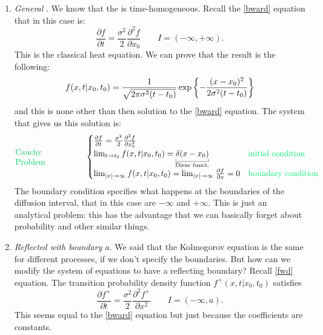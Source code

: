 \documentclass[12pt]{report}
\begin{document}
\begin{enumerate}
	\item \textit{General \bwm}. We know that the \bwm{} is time-homogeneous. Recall the \ref{bward} equation that in this case is:
	\begin{equation*}
		\frac{\partial f}{\partial t}=\frac{\sigma^{2}}{2}\frac{\partial^{2}f}{\partial x_{0}}\qquad I=(-\infty,+\infty).
	\end{equation*}
	This is the classical heat equation. We can prove that the result is the following:
	\begin{equation*}
		f(x,t|x_{0},t_{0})=\frac{1}{\sqrt{2\pi\sigma^{2}(t-t_{0})}}\exp\left\{-\frac{(x-x_{0})^{2}}{2\sigma^{2}(t-t_{0})}\right\}
	\end{equation*}
	and this is none other than then solution to the \ref{bward} equation. The system that gives us this solution is:
	\begin{equation*}
		\parbox{3cm}{\textcolor{SpringGreen3}{Cauchy\\Problem}}\begin{cases}
			\frac{\partial f}{\partial t}=\frac{\sigma^{2}}{2}\frac{\partial^{2}f}{\partial x_{0}^{2}}\\
			\lim_{t\to t_0}f(x,t|x_{0},t_{0})=\ubracketthin{\delta(x-x_{0})}_{\claptext{Dirac funct.}}&\text{\textcolor{SpringGreen2}{initial condition}}\\
			\lim_{|x|\to\infty}f(x,t|x_{0},t_{0})=\lim_{|x|\to\infty}\frac{\partial f}{\partial x}=0&\text{\textcolor{SpringGreen2}{boundary condition}}
		\end{cases}
	\end{equation*}
	The boundary condition specifies what happens at the boundaries of the diffusion interval, that in this case are $-\infty$ and $+\infty$. This is just an analytical problem: this has the advantage that we can basically forget about probability and other similar things.
	\item \textit{Reflected \bwm{} with boundary $a$}. We said that the Kolmogorov equation is the same for different processes, if we don't specify the boundaries. But how can we modify the system of equations to have a reflecting boundary? Recall \ref{fwd} equation. The transition probability density function $f^{+}(x,t|x_{0},t_{0})$ satisfies
	\begin{equation*}
		\frac{\partial f^{+}}{\partial t}=\frac{\sigma^{2}}{2}\frac{\partial^{2}f^{+}}{\partial x^{2}}\qquad I=(-\infty,a).
	\end{equation*}
	This seems equal to the \ref{bward} equation but just because the coefficients are constants.

\end{enumerate}
\end{document}
